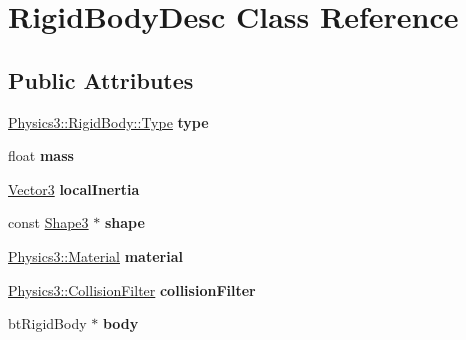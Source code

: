 \hypertarget{class_rigid_body_desc}{}\section{Rigid\+Body\+Desc Class Reference}
\label{class_rigid_body_desc}
\subsection*{Public Attributes}
\begin{DoxyCompactItemize}
\item 
\hyperlink{class_magnum_1_1_physics3_1_1_rigid_body_a429aa4fb7256b083334c86cdcd0d6b31}{Physics3\+::\+Rigid\+Body\+::\+Type} {\bfseries type}\hypertarget{class_rigid_body_desc_ae4744fc05ffac22873dfb82e6b652bf4}{}\label{class_rigid_body_desc_ae4744fc05ffac22873dfb82e6b652bf4}

\item 
float {\bfseries mass}\hypertarget{class_rigid_body_desc_a579678ddbe8447b2992d654da7ecba66}{}\label{class_rigid_body_desc_a579678ddbe8447b2992d654da7ecba66}

\item 
\hyperlink{class_magnum_1_1_vector3}{Vector3} {\bfseries local\+Inertia}\hypertarget{class_rigid_body_desc_a9b8ddeb5021629438cf28d0cf75e6ccb}{}\label{class_rigid_body_desc_a9b8ddeb5021629438cf28d0cf75e6ccb}

\item 
const \hyperlink{class_magnum_1_1_shape3}{Shape3} $\ast$ {\bfseries shape}\hypertarget{class_rigid_body_desc_a6f723b89e48b4c311f76dd800a33e2d7}{}\label{class_rigid_body_desc_a6f723b89e48b4c311f76dd800a33e2d7}

\item 
\hyperlink{class_magnum_1_1_physics3_1_1_material}{Physics3\+::\+Material} {\bfseries material}\hypertarget{class_rigid_body_desc_a506f84374f51c604fa3e93d17e583fda}{}\label{class_rigid_body_desc_a506f84374f51c604fa3e93d17e583fda}

\item 
\hyperlink{class_magnum_1_1_physics3_1_1_collision_filter}{Physics3\+::\+Collision\+Filter} {\bfseries collision\+Filter}\hypertarget{class_rigid_body_desc_af9c2cef683708419b398473a3cdbe101}{}\label{class_rigid_body_desc_af9c2cef683708419b398473a3cdbe101}

\item 
bt\+Rigid\+Body $\ast$ {\bfseries body}\hypertarget{class_rigid_body_desc_ab5aa53beaa9f84e68117e1686e7d0e88}{}\label{class_rigid_body_desc_ab5aa53beaa9f84e68117e1686e7d0e88}


\end{DoxyCompactItemize}
